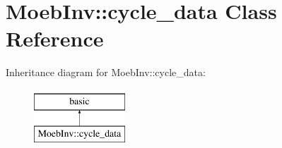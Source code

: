 \hypertarget{class_moeb_inv_1_1cycle__data}{}\section{Moeb\+Inv\+:\+:cycle\+\_\+data Class Reference}
\label{class_moeb_inv_1_1cycle__data}
Inheritance diagram for Moeb\+Inv\+:\+:cycle\+\_\+data\+:\begin{figure}[H]
\begin{center}
\leavevmode
\includegraphics[height=2.000000cm]{class_moeb_inv_1_1cycle__data}
\end{center}
\end{figure}
